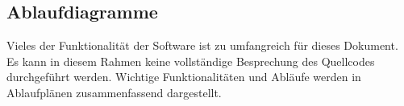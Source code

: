 \subsection{Ablaufdiagramme}
%
Vieles der Funktionalität der Software ist zu umfangreich für dieses Dokument. Es kann in diesem Rahmen keine vollständige Besprechung des Quellcodes durchgeführt werden. Wichtige Funktionalitäten und Abläufe werden in Ablaufplänen zusammenfassend dargestellt.
%

%

%

%
